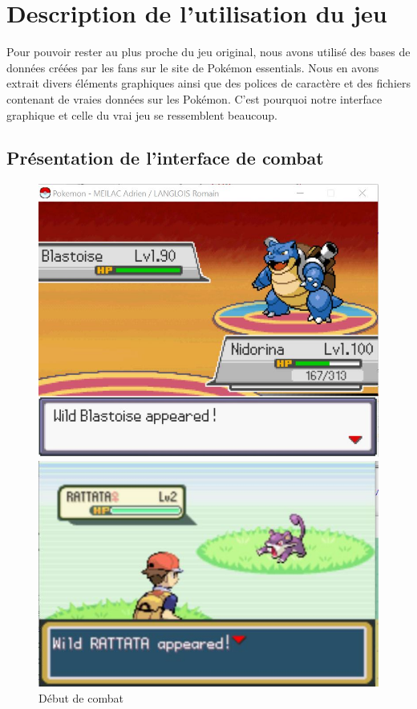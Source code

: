 \section{Description de l'utilisation du jeu}
Pour pouvoir rester au plus proche du jeu original, nous avons utilisé des bases de données créées par les fans sur le site de Pokémon essentials. Nous en avons extrait divers éléments graphiques ainsi que des polices de caractère et des fichiers contenant de vraies données sur les Pokémon. C'est pourquoi notre  interface graphique et celle du vrai jeu se ressemblent beaucoup. 

\subsection{Présentation de l'interface de combat}
\begin{figure}[!h]
\begin{minipage}{0.49\textwidth}
\includegraphics[scale = 0.6]{../Images/combat_start.jpg}
\end{minipage}
\begin{minipage}{0.49\textwidth}
\includegraphics[scale = 0.84]{../Images/vrai_jeu_combat_start.jpg}
\end{minipage}
\caption{Début de combat}
\end{figure}

